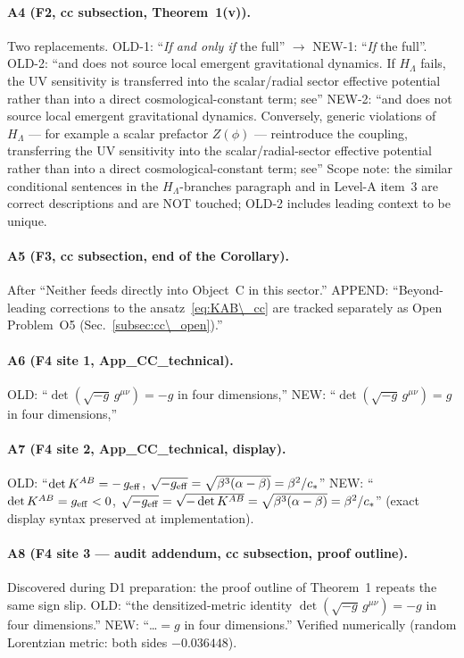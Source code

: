 \paragraph{A4 (F2, cc subsection, Theorem~1(v)).}
Two replacements.
OLD-1: ``\emph{If and only if} the full'' $\to$
NEW-1: ``\emph{If} the full''.
OLD-2: ``and does not source local emergent gravitational
dynamics. If $H_\Lambda$ fails, the UV sensitivity is transferred
into the scalar/radial sector effective potential rather than
into a direct cosmological-constant term; see''
NEW-2: ``and does not source local emergent gravitational
dynamics. Conversely, generic violations of $H_\Lambda$ --- for
example a scalar prefactor $Z(\phi)$ --- reintroduce the
coupling, transferring the UV sensitivity into the
scalar/radial-sector effective potential rather than into a
direct cosmological-constant term; see''
Scope note: the similar conditional sentences in the
$H_\Lambda$-branches paragraph and in Level-A item~3 are correct
descriptions and are NOT touched; OLD-2 includes leading context
to be unique.

\paragraph{A5 (F3, cc subsection, end of the Corollary).}
After ``Neither feeds directly into Object~C in this sector.''
APPEND: ``Beyond-leading corrections to the
ansatz~\eqref{eq:KAB\_cc} are tracked separately as Open
Problem~O5 (Sec.~\ref{subsec:cc\_open}).''

\paragraph{A6 (F4 site 1, App\_CC\_technical).}
OLD: ``$\det(\sqrt{-g}\,g^{\mu\nu}) = -g$ in four dimensions,''
NEW: ``$\det(\sqrt{-g}\,g^{\mu\nu}) = g$ in four dimensions,''

\paragraph{A7 (F4 site 2, App\_CC\_technical, display).}
OLD: ``$\det K^{AB} = -\,g_{\rm eff}$, $\sqrt{-g_{\rm eff}} =
\sqrt{\beta^3(\alpha-\beta)} = \beta^2/c_*$''
NEW: ``$\det K^{AB} = g_{\rm eff} < 0$, $\sqrt{-g_{\rm eff}} =
\sqrt{-\det K^{AB}} = \sqrt{\beta^3(\alpha-\beta)} =
\beta^2/c_*$''
(exact display syntax preserved at implementation).

\paragraph{A8 (F4 site 3 --- audit addendum, cc subsection,
proof outline).} Discovered during D1 preparation: the proof
outline of Theorem~1 repeats the same sign slip.
OLD: ``the densitized-metric identity
$\det(\sqrt{-g}\,g^{\mu\nu}) = -g$ in four dimensions.''
NEW: ``\ldots $= g$ in four dimensions.''
Verified numerically (random Lorentzian metric: both sides
$-0.036448$).

